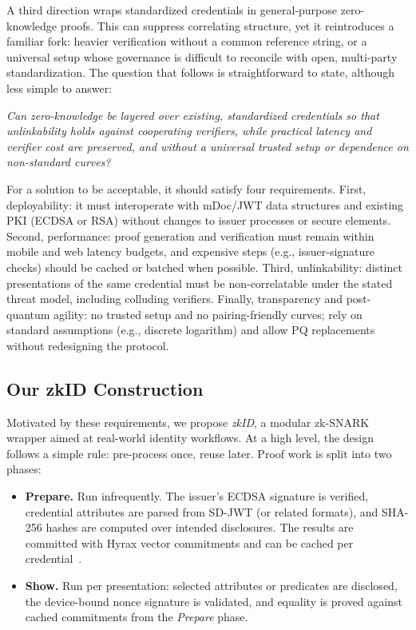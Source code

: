 A third direction wraps standardized credentials in general-purpose zero-knowledge proofs. This can suppress correlating structure, yet it reintroduces a familiar fork: heavier verification without a common reference string, or a universal setup whose governance is difficult to reconcile with open, multi-party standardization. The question that follows is straightforward to state, although less simple to answer:
\begin{center}
    \textit{Can zero-knowledge be layered over existing, standardized credentials so that unlinkability holds against cooperating verifiers, while practical latency and verifier cost are preserved, and without a universal trusted setup or dependence on non-standard curves?}
\end{center}

For a solution to be acceptable, it should satisfy four requirements. First, deployability: it must interoperate with mDoc/JWT data structures and existing PKI (ECDSA or RSA) without changes to issuer processes or secure elements. Second, performance: proof generation and verification must remain within mobile and web latency budgets, and expensive steps (e.g., issuer-signature checks) should be cached or batched when possible. Third, unlinkability: distinct presentations of the same credential must be non-correlatable under the stated threat model, including colluding verifiers. Finally, transparency and post-quantum agility: no trusted setup and no pairing-friendly curves; rely on standard assumptions (e.g., discrete logarithm) and allow PQ replacements without redesigning the protocol.

\subsection{Our zkID Construction}

Motivated by these requirements, we propose \emph{zkID}, a modular zk-SNARK wrapper aimed at real-world identity workflows. At a high level, the design follows a simple rule: pre-process once, reuse later. Proof work is split into two phases:
\begin{itemize}
    \item \textbf{Prepare.} Run infrequently. The issuer’s ECDSA signature is verified, credential attributes are parsed from SD-JWT (or related formats), and SHA-256 hashes are computed over intended disclosures. The results are committed with Hyrax vector commitments and can be cached per credential~\cite{cryptoeprint:2017/1132}.
    \item \textbf{Show.} Run per presentation: selected attributes or predicates are disclosed, the device-bound nonce signature is validated, and equality is proved against cached commitments from the \emph{Prepare} phase.
\end{itemize}

